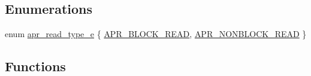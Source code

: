\subsection*{Enumerations}
\begin{DoxyCompactItemize}
\item 
enum \hyperlink{group__APR__Util__Bucket__Brigades_ga756973fb6392bd1026c3d96b4519776d}{apr\+\_\+read\+\_\+type\+\_\+e} \{ \hyperlink{group__APR__Util__Bucket__Brigades_gga756973fb6392bd1026c3d96b4519776da2d983f5b7fd996434e0dded171c261d8}{A\+P\+R\+\_\+\+B\+L\+O\+C\+K\+\_\+\+R\+E\+AD}, 
\hyperlink{group__APR__Util__Bucket__Brigades_gga756973fb6392bd1026c3d96b4519776da42b97663ca71fbbf2e2af7c8192e5dd8}{A\+P\+R\+\_\+\+N\+O\+N\+B\+L\+O\+C\+K\+\_\+\+R\+E\+AD}
 \}
\end{DoxyCompactItemize}
\subsection*{Functions}
